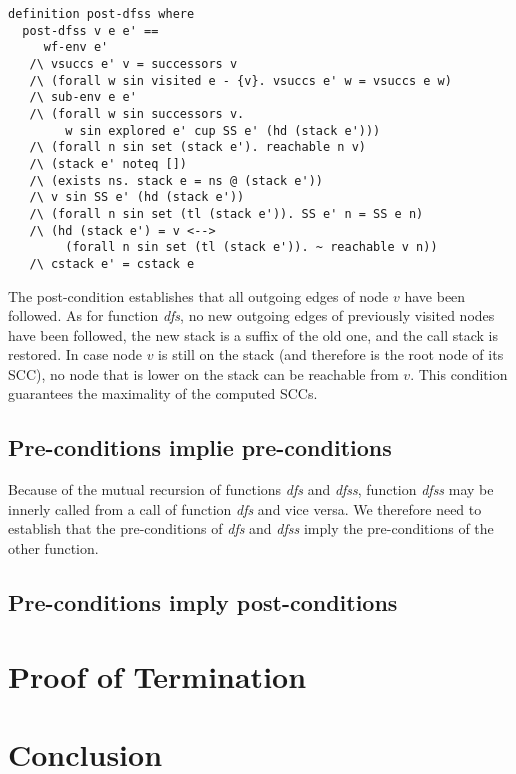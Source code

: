 \documentclass[sigplan,10pt,anonymous,review]{acmart}
\newcommand{\prog}[1]{\textit{#1}}
\begin{document}
\begin{small}
\begin{lstlisting}[language=isabelle]
definition post-dfss where 
  post-dfss v e e' == 
     wf-env e'
   /\ vsuccs e' v = successors v
   /\ (forall w sin visited e - {v}. vsuccs e' w = vsuccs e w)
   /\ sub-env e e'
   /\ (forall w sin successors v.
        w sin explored e' cup SS e' (hd (stack e')))
   /\ (forall n sin set (stack e'). reachable n v)
   /\ (stack e' noteq [])
   /\ (exists ns. stack e = ns @ (stack e'))
   /\ v sin SS e' (hd (stack e'))
   /\ (forall n sin set (tl (stack e')). SS e' n = SS e n)
   /\ (hd (stack e') = v <-->
        (forall n sin set (tl (stack e')). ~ reachable v n))
   /\ cstack e' = cstack e
\end{lstlisting}
\end{small}

The post-condition establishes that all outgoing edges of node $v$ have been followed. As for function \prog{dfs}, no new outgoing edges of previously visited nodes have been followed, the new stack is a suffix of the old one, and the call stack is restored. In case node $v$ is still on the stack (and therefore is the root node of its SCC), no node that is lower on the stack can be reachable from $v$. This condition guarantees the maximality of the computed SCCs.

\subsection{Pre-conditions implie pre-conditions}
Because of the mutual recursion of functions \prog{dfs} and \prog{dfss}, function \prog{dfss} may be innerly called from a call of function \prog{dfs} and vice versa. We therefore need to establish that the pre-conditions of \prog{dfs} and \prog{dfss} imply the pre-conditions of the other function.

\subsection{Pre-conditions imply post-conditions}

\section{Proof of Termination}
\label{sec:termination}


\section{Conclusion}
\label{sec:conclusion}




\end{document}
